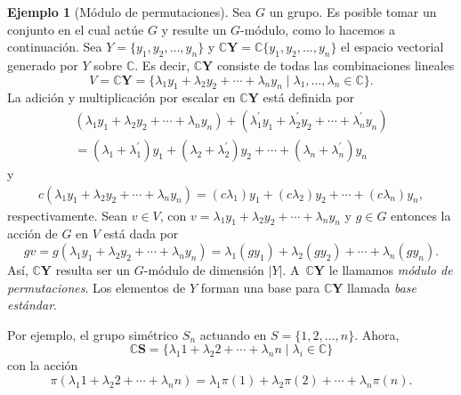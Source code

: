 \documentclass[12pt]{book}
\theoremstyle{definition}
\newtheorem{example}[theorem]{Ejemplo}
\newcounter{in}
\newcounter{ini}
\begin{document}
\begin{example}[Módulo de permutaciones]
  \label{CS}
  Sea $G$ un grupo. Es posible tomar un conjunto en el cual actúe $G$
  y resulte un $G$-módulo, como lo hacemos a continuación. Sea
  $Y=\{y_{1},y_{2},\ldots,y_{n}\}$ y $\mathbb{C}\boldsymbol{Y}=\mathbb{C}\{y_{1},y_{2},\ldots,y_{n}\}$ el
  espacio vectorial generado por $Y$ sobre $\mathbb{C}$. Es decir,
  $\mathbb{C}\boldsymbol{Y}$ consiste de todas las combinaciones lineales
  \begin{equation*}
    V=\mathbb{C}\boldsymbol{Y}=\{\lambda_{1}y_{1}+\lambda_{2}y_{2}+\cdots
    +\lambda_{n}y_{n}\mid\lambda_{1},\ldots,\lambda_{n}\in \mathbb{C}\}.
  \end{equation*}
  La adición y multiplicación por escalar
  en $\mathbb{C}\boldsymbol{Y}$ está definida por
  \begin{eqnarray*}
    (\lambda_{1}y_{1}+\lambda_{2}y_{2}+\cdots
    +\lambda_{n}y_{n})+(\lambda^{'}_{1}y_{1}+\lambda^{'}_{2}y_{2}+\cdots +\lambda^{'}_{n}y_{n})\\
    =(\lambda_{1}+\lambda^{'}_{1})y_{1}+(\lambda_{2}+\lambda^{'}_{2})y_{2}+\cdots
    +(\lambda_{n}+\lambda^{'}_{n})y_{n}
  \end{eqnarray*}
  y
  \begin{eqnarray*}
    c(\lambda_{1}y_{1}+\lambda_{2}y_{2}+\cdots +\lambda_{n}y_{n})=(c\lambda_{1})y_{1}+(c\lambda_{2})y_{2}+\cdots +(c\lambda_{n})y_{n},
  \end{eqnarray*}
  respectivamente. Sean $v\in V$, con
  $v=\lambda_{1}y_{1}+\lambda_{2}y_{2}+\cdots+\lambda_{n}y_{n}$ y
  $g\in G$ entonces la acción de $G$ en $V$ está dada por
  \begin{equation*}
    gv=g(\lambda_{1}y_{1}+\lambda_{2}y_{2}+\cdots +\lambda_{n}y_{n})=\lambda_{1}(gy_{1})+\lambda_{2}(gy_{2})+\cdots +\lambda_{n}(gy_{n}).
  \end{equation*}
  Así, $\mathbb{C}\boldsymbol{Y}$ resulta ser un $G$-módulo
  de dimensión $|Y|$. A~$\mathbb{C}\boldsymbol{Y}$ le llamamos
  \emph{módulo de permutaciones}. Los elementos de
  $Y$ forman una base para $\mathbb{C}\boldsymbol{Y}$ llamada
  \emph{base estándar}.

  Por ejemplo, el grupo simétrico $S_{n}$ actuando en $S=\{1,2,\ldots,n\}$. Ahora,
  \begin{equation*}
    \mathbb{C}\boldsymbol{S}=\{\lambda_{1}1+\lambda_{2}2+\cdots+\lambda_{n}n\mid \lambda_{i}\in\mathbb{C}\}
  \end{equation*}
  con la acción
  \begin{equation*}
    \pi(\lambda_{1}1+\lambda_{2}2+\cdots+\lambda_{n}n)=\lambda_{1}\pi(1)+\lambda_{2}\pi(2)+\cdots+\lambda_{n}\pi(n).
  \end{equation*}


\end{example}
\end{document}
